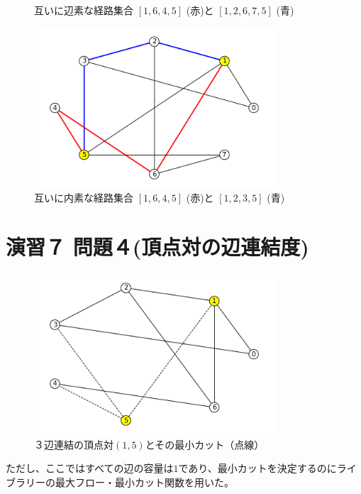 \documentclass{report}
\begin{document}
\begin{CJK}{UTF8}{min}
\begin{figure}[!h]
        \caption{互いに辺素な経路集合 $[1,6,4,5]$ (赤)と $[1,2,6,7,5]$ (青)}
    \end{figure}
    \begin{figure}[!h]
        \centerline{\includegraphics[width=0.8\textwidth]{data/10.png}}
        \caption{互いに内素な経路集合 $[1,6,4,5]$ (赤)と $[1,2,3,5]$ (青)}
    \end{figure}

    \clearpage
    \section*{演習７ 問題４(頂点対の辺連結度)}
    \begin{figure}[!h]
        \centerline{\includegraphics[width=0.8\textwidth]{data/11.png}}
        \caption{３辺連結の頂点対$(1,5)$とその最小カット（点線）}
    \end{figure}
    ただし、ここではすべての辺の容量は$1$であり、最小カットを決定するのにライブラリーの最大フロー・最小カット関数を用いた。

    \clearpage

\end{CJK}
\end{document}

